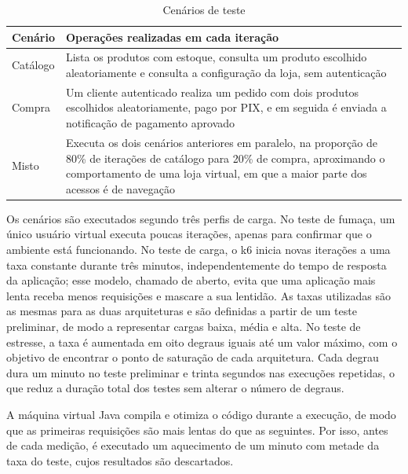\begin{table}[htbp]
\centering
\caption{Cenários de teste}
\label{tab:cenarios}
\small
\begin{tabular}{|>{\raggedright\arraybackslash}p{2.4cm}|>{\raggedright\arraybackslash}p{12.2cm}|}
\hline
\textbf{Cenário} & \textbf{Operações realizadas em cada iteração} \\ \hline
Catálogo & Lista os produtos com estoque, consulta um produto escolhido aleatoriamente e consulta a configuração da loja, sem autenticação \\ \hline
Compra & Um cliente autenticado realiza um pedido com dois produtos escolhidos aleatoriamente, pago por PIX, e em seguida é enviada a notificação de pagamento aprovado \\ \hline
Misto & Executa os dois cenários anteriores em paralelo, na proporção de 80\% de iterações de catálogo para 20\% de compra, aproximando o comportamento de uma loja virtual, em que a maior parte dos acessos é de navegação \\ \hline
\end{tabular}
\par\vspace{4pt}{\footnotesize Fonte: Elaborada pelo autor (2026).}
\end{table}

Os cenários são executados segundo três perfis de carga. No teste de fumaça, um único usuário
virtual executa poucas iterações, apenas para confirmar que o ambiente está funcionando. No
teste de carga, o k6 inicia novas iterações a uma taxa constante durante três minutos,
independentemente do tempo de resposta da aplicação; esse modelo, chamado de aberto, evita que
uma aplicação mais lenta receba menos requisições e mascare a sua lentidão. As taxas
utilizadas são as mesmas para as duas arquiteturas e são definidas a partir de um teste
preliminar, de modo a representar cargas baixa, média e alta. No teste de estresse, a taxa é
aumentada em oito degraus iguais até um valor máximo, com o objetivo de encontrar o ponto de
saturação de cada arquitetura. Cada degrau dura um minuto no teste preliminar e trinta segundos
nas execuções repetidas, o que reduz a duração total dos testes sem alterar o número de degraus.

A máquina virtual Java compila e otimiza o código durante a execução, de modo que as primeiras
requisições são mais lentas do que as seguintes. Por isso, antes de cada medição, é executado
um aquecimento de um minuto com metade da taxa do teste, cujos resultados são descartados.

